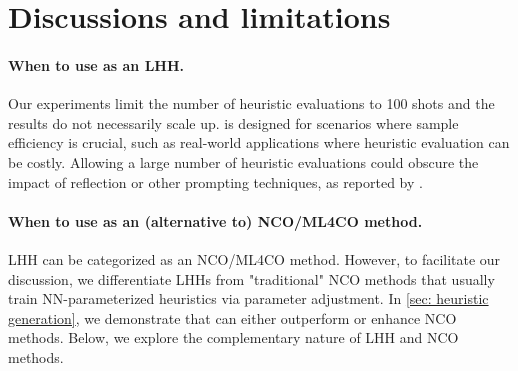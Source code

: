 
\section{Discussions and limitations}\label{sec: discussions and limitations}

\paragraph{When to use \our{} as an LHH.}
Our experiments limit the number of heuristic evaluations to 100 shots and the results do not necessarily scale up. \our{} is designed for scenarios where sample efficiency is crucial, such as real-world applications where heuristic evaluation can be costly. Allowing a large number of heuristic evaluations could obscure the impact of reflection or other prompting techniques, as reported by \citet{zhang2024understanding}.

\paragraph{When to use \our{} as an (alternative to) NCO/ML4CO method.}

LHH can be categorized as an NCO/ML4CO method. However, to facilitate our discussion, we differentiate LHHs from "traditional" NCO methods that usually train NN-parameterized heuristics via parameter adjustment.
In \cref{sec: heuristic generation}, we demonstrate that \our{} can either outperform or enhance NCO methods. Below, we explore the complementary nature of LHH and NCO methods.

